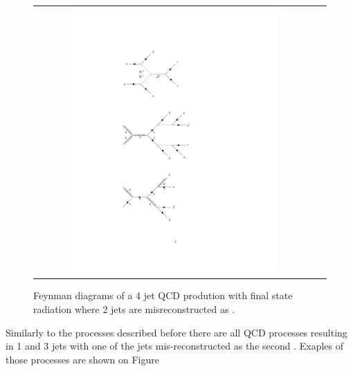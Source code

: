 \begin{figure}[tbh!]
	\centering
	\begin{tabular}{cc}
		\includegraphics[width=0.75\textwidth]{diagrams/pics/background_QCDfinrad.pdf}
	\end{tabular}
	\caption{Feynman diagrams of a 4 jet QCD prodution with final state radiation where 2 jets are misreconstructed as \hadtau. }
	\label{fig:background_QCDfinrad}
\end{figure}

Similarly to the processes described before there are all QCD processes resulting in 1 \hadtau and 3 jets with one of the jets mis-reconstructed as the second \hadtau. Exaples of those processes are shown on Figure

